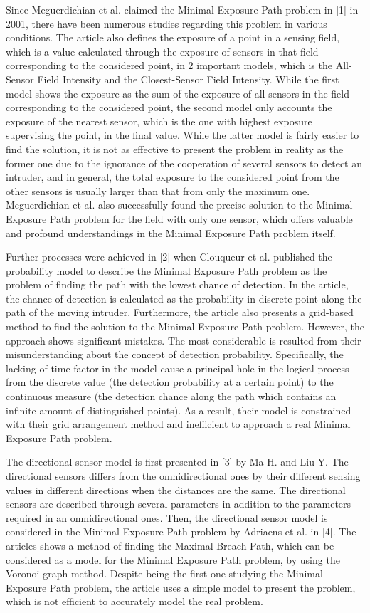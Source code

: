 \documentclass[final]{elsarticle}
\begin{document}
Since Meguerdichian et al. claimed the Minimal Exposure Path problem in [1] in 2001, there have been numerous studies regarding this problem in various conditions. The article also defines the exposure of a point in a sensing field, which is a value calculated through the exposure of sensors in that field corresponding to the considered point, in 2 important models, which is the All-Sensor Field Intensity and the Closest-Sensor Field Intensity. While the first model shows the exposure as the sum of the exposure of all sensors in the field corresponding to the considered point, the second model only accounts the exposure of the nearest sensor, which is the one with highest exposure supervising the point, in the final value. While the latter model is fairly easier to find the solution, it is not as effective to present the problem in reality as the former one due to the ignorance of the cooperation of several sensors to detect an intruder, and in general, the total exposure to the considered point from the other sensors is usually larger than that from only the maximum one. Meguerdichian et al. also successfully found the precise solution to the Minimal Exposure Path problem for the field with only one sensor, which offers valuable and profound understandings in the Minimal Exposure Path problem itself.

Further processes were achieved in [2] when Clouqueur et al. published the probability model to describe the Minimal Exposure Path problem as the problem of finding the path with the lowest chance of detection. In the article, the chance of detection is calculated as the probability in discrete point along the path of the moving intruder. Furthermore, the article also presents a grid-based method to find the solution to the Minimal Exposure Path problem. However, the approach shows significant mistakes. The most considerable is resulted from their misunderstanding about the concept of detection probability. Specifically, the lacking of time factor in the model cause a principal hole in the logical process from the discrete value (the detection probability at a certain point) to the continuous measure (the detection chance along the path which contains an infinite amount of distinguished points). As a result, their model is constrained with their grid arrangement method and inefficient to approach a real Minimal Exposure Path problem.

The directional sensor model is first presented in [3] by Ma H. and Liu Y. The directional sensors differs from the omnidirectional ones by their different sensing values in different directions when the distances are the same. The directional sensors are described through several parameters in addition to the parameters required in an omnidirectional ones. Then, the directional sensor model is considered in the Minimal Exposure Path problem by Adriaens et al. in [4]. The articles shows a method of finding the Maximal Breach Path, which can be considered as a model for the Minimal Exposure Path problem, by using the Voronoi graph method. Despite being the first one studying the Minimal Exposure Path problem, the article uses a simple model to present the problem, which is not efficient to accurately model the real problem.
\end{document}
